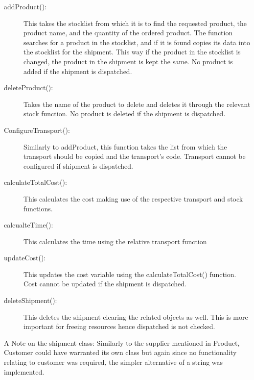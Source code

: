 \documentclass[12pt, a4paper]{report}
\begin{document}
\begin{description}
   \item [addProduct():] This takes the stocklist from which it is to find the requested product, the product name, and the quantity of the ordered product. The function searches for a product in the stocklist, and if it is found copies its data into the stocklist for the shipment. This way if the product in the stocklist is changed, the product in the shipment is kept the same. No product is added if the shipment is dispatched.
   \item[deleteProduct():] Takes the name of the product to delete and deletes it through the relevant stock function. No product is deleted if the shipment is dispatched.
   \item[ConfigureTransport():] Similarly to addProduct, this function takes the list from which the transport should be copied and the transport's code. Transport cannot be configured if shipment is dispatched.
   \item[calculateTotalCost():] This calculates the cost making use of the respective transport and stock functions. 
   \item[calcualteTime():] This calculates the time using the relative transport function
   \item[updateCost():] This updates the cost variable using the calculateTotalCost() function. Cost cannot be updated if the shipment is dispatched.
   \item[deleteShipment():] This deletes the shipment clearing the related objects as well. This is more important for freeing resources hence dispatched is not checked.
\end{description}

A Note on the shipment class: Similarly to the supplier mentioned in Product, Customer could have warranted its own class but again since no functionality relating to customer was required, the simpler alternative of a string was implemented.
\end{document}
